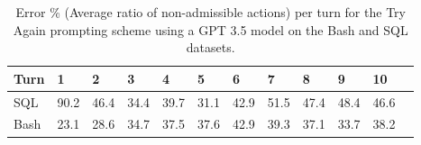 \begin{table}[H]
    \centering
    \begin{tabular}{llllllllllll}
        \toprule
        Turn & 1 & 2 & 3 & 4 & 5 & 6 & 7 & 8 & 9 & 10 \\
        \midrule
        SQL  & 90.2 & 46.4 & 34.4 & 39.7 & 31.1 & 42.9 & 51.5 & 47.4 & 48.4 & 46.6 \\
        Bash & 23.1 & 28.6 & 34.7 & 37.5 & 37.6 & 42.9 & 39.3 & 37.1 & 33.7 & 38.2 \\
        \bottomrule
    \end{tabular}
    \vspace{0.5em}
    \caption{Error \% (Average ratio of non-admissible actions) per turn for the Try Again prompting scheme using a GPT 3.5 model on the Bash and SQL \benchmark{} datasets.}
    \vspace{-1.5em}
    \label{table:error-rate}
\end{table}
